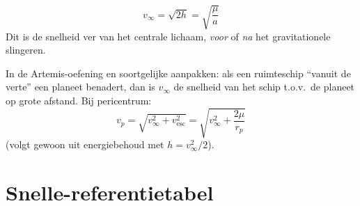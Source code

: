 \documentclass[11pt, a4paper]{article}
\begin{document}
\begin{formule}
\[
  v_\infty = \sqrt{2h} = \sqrt{\frac{\mu}{a}}
\]
Dit is de snelheid ver van het centrale lichaam, \emph{voor} of \emph{na} het gravitationele slingeren.
\end{formule}

\begin{weetje}
In de Artemis-oefening en soortgelijke aanpakken: als een ruimteschip ``vanuit de verte'' een planeet benadert, dan is $v_\infty$ de snelheid van het schip t.o.v.\ de planeet op grote afstand. Bij pericentrum:
\[
  v_p = \sqrt{v_\infty^2 + v_\mathrm{esc}^2}
  = \sqrt{v_\infty^2 + \frac{2\mu}{r_p}}
\]
(volgt gewoon uit energiebehoud met $h = v_\infty^2/2$).
\end{weetje}

\section{Snelle-referentietabel}
\end{document}
